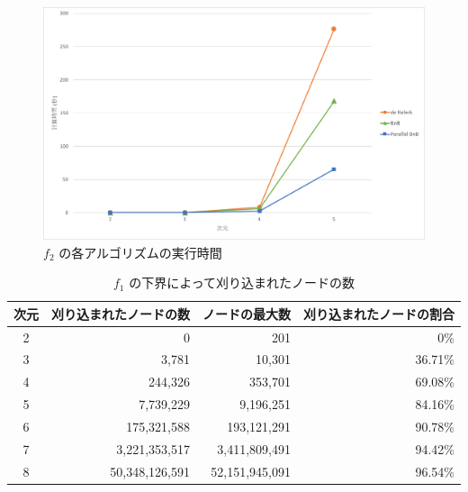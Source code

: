 \documentclass[a4paper,11pt]{jreport}
\begin{document}
\begin{figure}[h]
\begin{center}
\includegraphics[width=15cm]{graphs/f_2_time.pdf}
\caption{$ f_2 $ の各アルゴリズムの実行時間}
\label{fig:f_2_time}
\end{center}
\end{figure}

\newpage

\begin{table}[h]
\caption{$ f_1 $ の下界によって刈り込まれたノードの数}
\label{tbl:f_1_eliminated}
\begin{center}
\begin{tabular}{|c|r|r|r|} \hline
次元 & 刈り込まれたノードの数 & ノードの最大数 & 刈り込まれたノードの割合 \\ \hline
2 & 0 & 201 & 0\% \\
3 & 3,781 & 10,301 & 36.71\% \\
4 & 244,326 & 353,701 & 69.08\% \\
5 & 7,739,229 & 9,196,251 & 84.16\% \\
6 & 175,321,588 & 193,121,291 & 90.78\% \\
7 & 3,221,353,517 & 3,411,809,491 & 94.42\% \\
8 & 50,348,126,591 & 52,151,945,091 & 96.54\% \\ \hline
\end{tabular}
\end{center}
\end{table}
\end{document}
